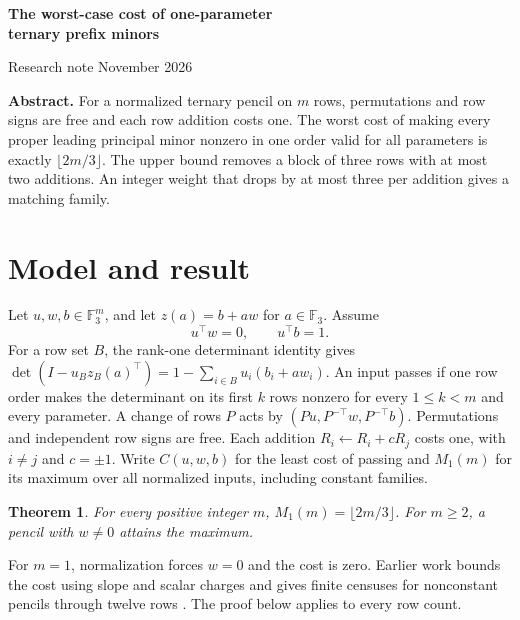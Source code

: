 \documentclass[a4paper,11pt]{article}
\newcommand{\F}{\mathbb F_3}
\newcommand{\cost}{\lfloor 2m/3\rfloor}
\newtheorem{thm}{Theorem}
\begin{document}
\begin{center}
{\LARGE\bfseries The worst-case cost of one-parameter\\ ternary prefix minors\par}
\medskip Research note  November 2026
\end{center}
\noindent\textbf{Abstract.} For a normalized ternary pencil on $m$ rows, permutations and row signs are free and each row addition costs one. The worst cost of making every proper leading principal minor nonzero in one order valid for all parameters is exactly $\cost$. The upper bound removes a block of three rows with at most two additions. An integer weight that drops by at most three per addition gives a matching family.

\section{Model and result}
Let $u,w,b\in\F^m$, and let $z(a)=b+aw$ for $a\in\F$. Assume
\[
                    u^\top w=0,\qquad u^\top b=1 .
\]
For a row set $B$, the rank-one determinant identity gives
$\det(I-u_B z_B(a)^\top)=1-\sum_{i\in B}u_i(b_i+aw_i)$.
An input passes if one row order makes the determinant on its first $k$ rows nonzero for every $1\le k<m$ and every parameter.
A change of rows $P$ acts by $(Pu,P^{-\top}w,P^{-\top}b)$. Permutations and independent row signs are free. Each addition $R_i\gets R_i+cR_j$ costs one, with $i\ne j$ and $c=\pm1$.
Write $C(u,w,b)$ for the least cost of passing and $M_1(m)$ for its maximum over all normalized inputs, including constant families.
\begin{thm}
For every positive integer $m$, $M_1(m)=\cost$. For $m\ge2$, a pencil with $w\ne0$ attains the maximum.
\end{thm}
For $m=1$, normalization forces $w=0$ and the cost is zero. Earlier work bounds the cost using slope and scalar charges and gives finite censuses for nonconstant pencils through twelve rows \cite{prior,census}. The proof below applies to every row count.
\end{document}
